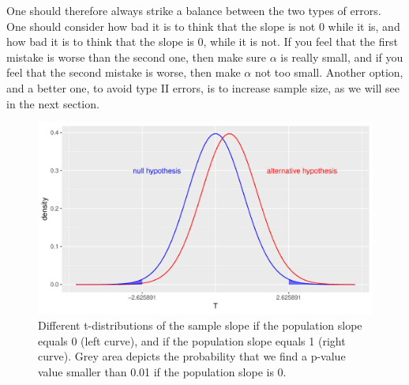 \documentclass[]{report}\usepackage[]{graphicx}\usepackage[]{color}
\makeatletter
\def\maxwidth{ %
  \ifdim\Gin@nat@width>\linewidth
    \linewidth
  \else
    \Gin@nat@width
  \fi
}
\newenvironment{knitrout}{}{} %
\makeatother
\begin{document}
One should therefore always strike a balance between the two types of errors. One should consider how bad it is to think that the slope is not 0 while it is, and how bad it is to think that the slope is 0, while it is not. If you feel that the first mistake is worse than the second one, then make sure $\alpha$ is really small, and if you feel that the second mistake is worse, then make $\alpha$ not too small. Another option, and a better one, to avoid type II errors, is to increase sample size, as we will see in the next section.

\begin{knitrout}
\color{fgcolor}\begin{figure}

{\centering \includegraphics[width=\maxwidth]{figure/inf_22-1} 

}

\caption[Different t-distributions of the sample slope if the population slope equals 0 (left curve), and if the population slope equals 1 (right curve)]{Different t-distributions of the sample slope if the population slope equals 0 (left curve), and if the population slope equals 1 (right curve). Grey area depicts the probability that we find a p-value value smaller than 0.01 if the population slope is 0.}\label{fig:inf_22}
\end{figure}


\end{knitrout}
\end{document}
